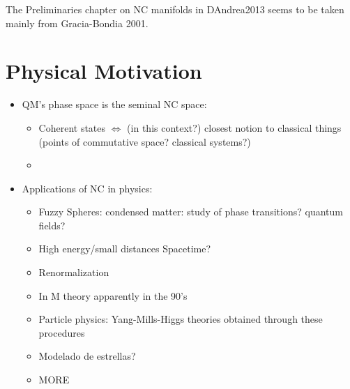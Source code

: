 The Preliminaries chapter on NC manifolds in DAndrea2013 seems to be taken mainly from Gracia-Bondia 2001.

\section{Physical Motivation}

    \begin{itemize}
        
    \item QM's phase space is the seminal NC space: 
    
        \begin{itemize}
            
        \item Coherent states $\iff$ (in this context?) closest notion to classical things (points of commutative space? classical systems?)
        
        \item 
            
        \end{itemize}
    
    \item Applications of NC in physics:
    
        \begin{itemize}
            
        \item Fuzzy Spheres: condensed matter: study of phase transitions? quantum fields?
        
        \item High energy/small distances Spacetime? 
        
        \item Renormalization
    
        \item In M theory apparently in the 90's 
    
        \item Particle physics: Yang-Mills-Higgs theories obtained through these procedures
        
        \item Modelado de estrellas?
        
        \item MORE
            

\end{itemize}
\end{itemize}
